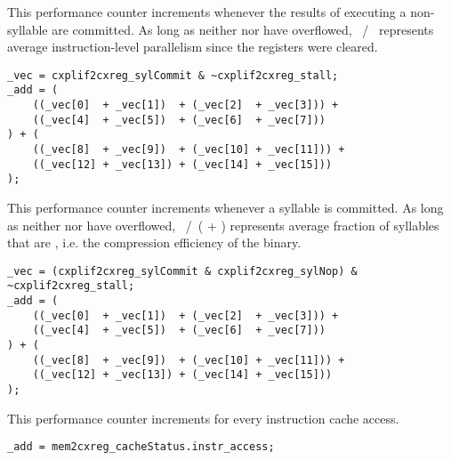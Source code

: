 This performance counter increments whenever the results of executing a 
non- syllable are committed. As long as neither  nor 
 have overflowed, ~/~ represents average 
instruction-level parallelism since the registers were cleared.

\declaration{}
\implementation{}
\begin{lstlisting}
_vec = cxplif2cxreg_sylCommit & ~cxplif2cxreg_stall;
_add = (
    ((_vec[0]  + _vec[1])  + (_vec[2]  + _vec[3])) +
    ((_vec[4]  + _vec[5])  + (_vec[6]  + _vec[7]))
) + (
    ((_vec[8]  + _vec[9])  + (_vec[10] + _vec[11])) +
    ((_vec[12] + _vec[13]) + (_vec[14] + _vec[15]))
);
\end{lstlisting}


This performance counter increments whenever a  syllable is committed. 
As long as neither  nor  have overflowed, 
~/~( + ) represents average fraction of syllables 
that are , i.e. the compression efficiency of the binary.

\declaration{}
\implementation{}
\begin{lstlisting}
_vec = (cxplif2cxreg_sylCommit & cxplif2cxreg_sylNop) & ~cxplif2cxreg_stall;
_add = (
    ((_vec[0]  + _vec[1])  + (_vec[2]  + _vec[3])) +
    ((_vec[4]  + _vec[5])  + (_vec[6]  + _vec[7]))
) + (
    ((_vec[8]  + _vec[9])  + (_vec[10] + _vec[11])) +
    ((_vec[12] + _vec[13]) + (_vec[14] + _vec[15]))
);
\end{lstlisting}


This performance counter increments for every instruction cache access.

\implementation{}
\begin{lstlisting}
_add = mem2cxreg_cacheStatus.instr_access;
\end{lstlisting}

